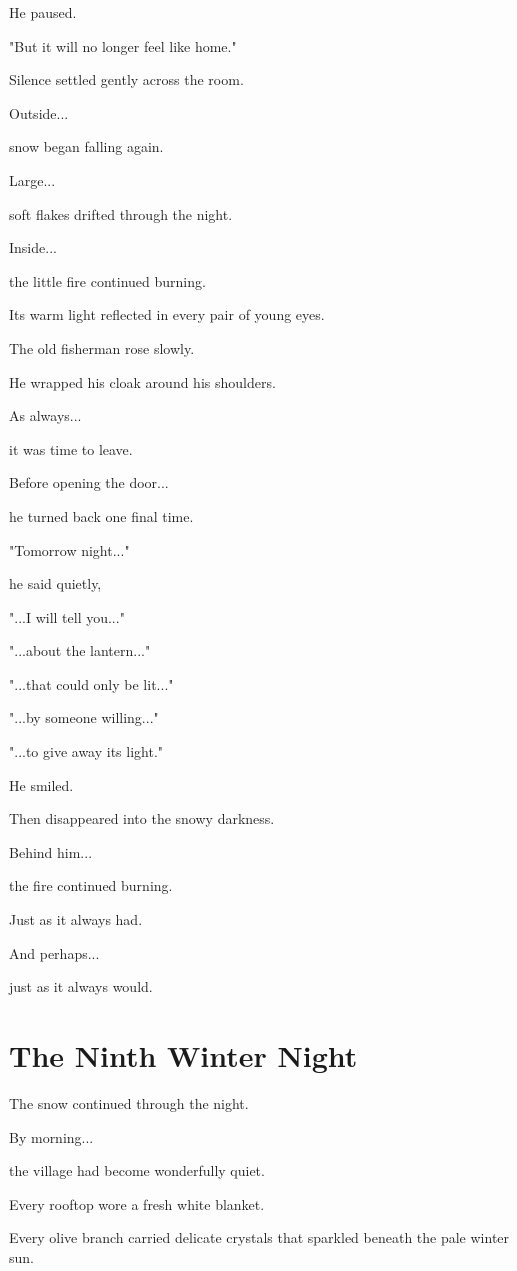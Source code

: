 \documentclass[12pt,openany]{book}
\begin{document}
He paused.

"But it will no longer feel like home."

Silence settled gently across the room.

Outside...

snow began falling again.

Large...

soft flakes drifted through the night.

Inside...

the little fire continued burning.

Its warm light reflected in every pair of young eyes.

The old fisherman rose slowly.

He wrapped his cloak around his shoulders.

As always...

it was time to leave.

Before opening the door...

he turned back one final time.

"Tomorrow night..."

he said quietly,

"...I will tell you..."

"...about the lantern..."

"...that could only be lit..."

"...by someone willing..."

"...to give away its light."

He smiled.

Then disappeared into the snowy darkness.

Behind him...

the fire continued burning.

Just as it always had.

And perhaps...

just as it always would.
\chapter{The Ninth Winter Night}

The snow continued through the night.

By morning...

the village had become wonderfully quiet.

Every rooftop wore a fresh white blanket.

Every olive branch carried delicate crystals that sparkled beneath the pale winter sun.
\end{document}
